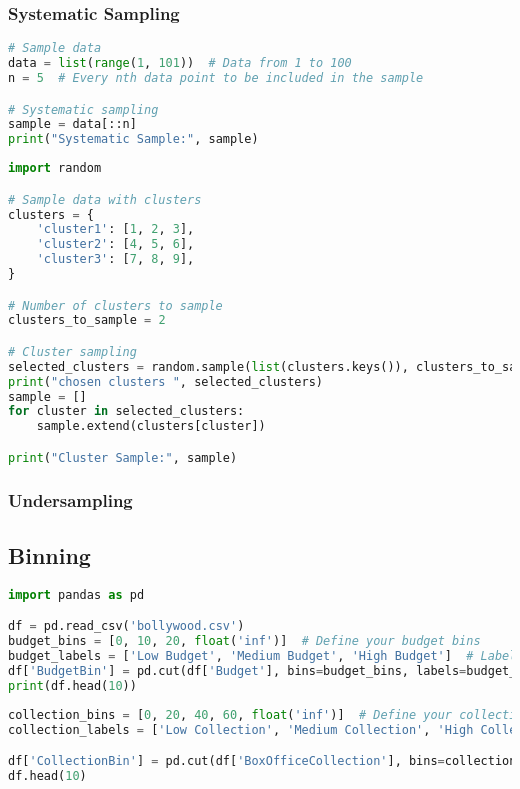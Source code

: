 \documentclass[11pt]{article}
\begin{document}
\subsubsection{Systematic Sampling}
\label{sec:orgab3e146}
\begin{lstlisting}[language=Python,numbers=none]
# Sample data
data = list(range(1, 101))  # Data from 1 to 100
n = 5  # Every nth data point to be included in the sample

# Systematic sampling
sample = data[::n]
print("Systematic Sample:", sample)
\end{lstlisting}


\begin{lstlisting}[language=Python,numbers=none]
import random

# Sample data with clusters
clusters = {
    'cluster1': [1, 2, 3],
    'cluster2': [4, 5, 6],
    'cluster3': [7, 8, 9],
}

# Number of clusters to sample
clusters_to_sample = 2

# Cluster sampling
selected_clusters = random.sample(list(clusters.keys()), clusters_to_sample)
print("chosen clusters ", selected_clusters)
sample = []
for cluster in selected_clusters:
    sample.extend(clusters[cluster])

print("Cluster Sample:", sample)
\end{lstlisting}
\subsubsection{Undersampling}
\label{sec:org7238a35}
\subsection{Binning}
\label{sec:org041ed66}
\begin{lstlisting}[language=Python,numbers=none]
import pandas as pd

df = pd.read_csv('bollywood.csv')
budget_bins = [0, 10, 20, float('inf')]  # Define your budget bins
budget_labels = ['Low Budget', 'Medium Budget', 'High Budget']  # Labels for the bins
df['BudgetBin'] = pd.cut(df['Budget'], bins=budget_bins, labels=budget_labels)
print(df.head(10))
\end{lstlisting}

\begin{lstlisting}[language=Python,numbers=none]
collection_bins = [0, 20, 40, 60, float('inf')]  # Define your collection bins
collection_labels = ['Low Collection', 'Medium Collection', 'High Collection', 'Very High Collection']  # Labels for the bins

df['CollectionBin'] = pd.cut(df['BoxOfficeCollection'], bins=collection_bins, labels=collection_labels)
df.head(10)
\end{lstlisting}
\end{document}
